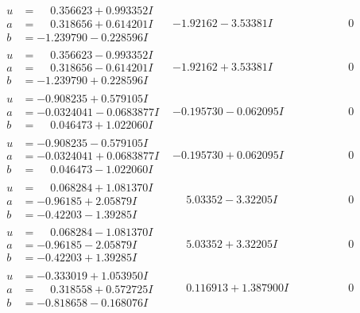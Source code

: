 \documentclass[1p]{elsarticle_modified}
\theoremstyle{definition}
\begin{document}
$$\begin{array}{c|c|c}
\begin{aligned}
u &= \phantom{-}0.356623 + 0.993352 I \\
a &= \phantom{-}0.318656 + 0.614201 I \\
b &= -1.239790 - 0.228596 I\end{aligned}
 & -1.92162 - 3.53381 I & \phantom{-0.000000 } 0 \\ \hline\begin{aligned}
u &= \phantom{-}0.356623 - 0.993352 I \\
a &= \phantom{-}0.318656 - 0.614201 I \\
b &= -1.239790 + 0.228596 I\end{aligned}
 & -1.92162 + 3.53381 I & \phantom{-0.000000 } 0 \\ \hline\begin{aligned}
u &= -0.908235 + 0.579105 I \\
a &= -0.0324041 - 0.0683877 I \\
b &= \phantom{-}0.046473 + 1.022060 I\end{aligned}
 & -0.195730 - 0.062095 I & \phantom{-0.000000 } 0 \\ \hline\begin{aligned}
u &= -0.908235 - 0.579105 I \\
a &= -0.0324041 + 0.0683877 I \\
b &= \phantom{-}0.046473 - 1.022060 I\end{aligned}
 & -0.195730 + 0.062095 I & \phantom{-0.000000 } 0 \\ \hline\begin{aligned}
u &= \phantom{-}0.068284 + 1.081370 I \\
a &= -0.96185 + 2.05879 I \\
b &= -0.42203 - 1.39285 I\end{aligned}
 & \phantom{-}5.03352 - 3.32205 I & \phantom{-0.000000 } 0 \\ \hline\begin{aligned}
u &= \phantom{-}0.068284 - 1.081370 I \\
a &= -0.96185 - 2.05879 I \\
b &= -0.42203 + 1.39285 I\end{aligned}
 & \phantom{-}5.03352 + 3.32205 I & \phantom{-0.000000 } 0 \\ \hline\begin{aligned}
u &= -0.333019 + 1.053950 I \\
a &= \phantom{-}0.318558 + 0.572725 I \\
b &= -0.818658 - 0.168076 I\end{aligned}
 & \phantom{-}0.116913 + 1.387900 I & \phantom{-0.000000 } 0 \\ \hline\begin{aligned}

\end{aligned}
\end{array}$$
\end{document}
